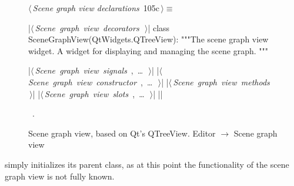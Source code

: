 \documentclass[%
    a4paper,    %
    justified,  %
    nobib,      %
    openany     %
]{tufte-book}
\makeatletter
\renewcommand{\label}[1]{\@tufte@label{##1}}%
\makeatother
\begin{document}
\begin{figure}[!htbp]
\begin{flushleft} \small
\begin{minipage}{\linewidth}\label{scrap39}\raggedright\small
{} $\langle\,${\itshape Scene graph view declarations}\nobreak\ {\footnotesize {105c}}$\,\rangle\equiv$
\vspace{-1ex}
\begin{pythoncode}
|\hbox{$\langle\,${\itshape Scene graph view decorators}\nobreak\ {\footnotesize {}}$\,\rangle$}|
class SceneGraphView(QtWidgets.QTreeView):
    """The scene graph view widget.
    A widget for displaying and managing the scene graph.
    """

    |\hbox{$\langle\,${\itshape Scene graph view signals}\nobreak\ {\footnotesize {}, \ldots\ }$\,\rangle$}|
    |\hbox{$\langle\,${\itshape Scene graph view constructor}\nobreak\ {\footnotesize {}, \ldots\ }$\,\rangle$}|
    |\hbox{$\langle\,${\itshape Scene graph view methods}\nobreak\ {\footnotesize {}}$\,\rangle$}|
    |\hbox{$\langle\,${\itshape Scene graph view slots}\nobreak\ {\footnotesize {}, \ldots\ }$\,\rangle$}|
|\NWsep|
\end{pythoncode}
\vspace{1.5ex}
\footnotesize
\begin{list}{}{\setlength{\itemsep}{-\parsep}\setlength{\itemindent}{-\leftmargin}}
\item \NWtxtMacroRefIn\ .

\item{}
\end{list}
\end{minipage}\vspace{4ex}
\end{flushleft}
\caption{Scene graph view, based on Qt's QTreeView.
  \newline{}\newline{}Editor $\rightarrow$ Scene graph view}
\end{figure}

 simply initializes its parent class, as at this
point the functionality of the scene graph view is not fully known.
\end{document}
